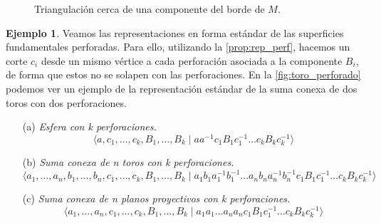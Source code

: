 \documentclass[10pt]{report}
\theoremstyle{definition}
\newtheorem{eje}[defin]{Ejemplo}
\begin{document}
\begin{figure}[h]
\caption{Triangulación cerca de una componente del borde de $M$.\label{fig:triangulacion_perf}}
\end{figure}
\begin{eje}
Veamos las representaciones en forma estándar de las superficies fundamentales perforadas. Para ello, utilizando la \autoref{prop:rep_perf}, hacemos un corte $c_i$ desde un mismo vértice a cada perforación asociada a la componente $B_i$, de forma que estos no se solapen con las perforaciones. En la \autoref{fig:toro_perforado} podemos ver un ejemplo de la representación estándar de la suma conexa de dos toros con dos perforaciones.
\begin{itemize}
\item [(a)] \textit{Esfera con k perforaciones.} 
$$\langle a, c_1,\dots ,c_k, B_1, \dots ,B_k \mid aa^{-1}c_1B_1c_1^{-1}\dots c_kB_kc_k^{-1}\rangle$$ 
\item[(b)] \textit{Suma conexa de n toros con k perforaciones.}
$$\langle a_1,\dots ,a_n, b_1,\dots ,b_n, c_1,\dots ,c_k, B_1,\dots ,B_k\mid a_1b_1a_1^{-1}b_1^{-1}\dots a_nb_na_n^{-1}b_n^{-1}c_1B_1c_1^{-1}\dots c_kB_kc_k^{-1}\rangle$$ 
\item[(c)] \textit{Suma conexa de n planos proyectivos con k perforaciones.} 
$$\langle a_1,\dots ,a_n, c_1,\dots ,c_k, B_1,\dots ,B_k\mid a_1a_1\dots a_na_nc_1B_1c_1^{-1}\dots c_kB_kc_k^{-1} \rangle$$
\end{itemize}
\end{eje}
\end{document}
